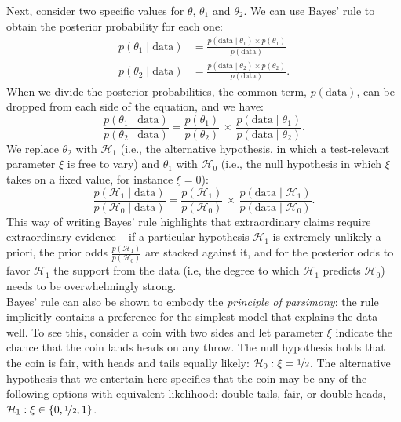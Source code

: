 Next, consider two specific values for $\theta$, $\theta_1$ and $\theta_2$. We can use Bayes' rule to obtain the posterior probability for each one:
\begin{align}
p(\theta_1 \mid \text{data})& =  \frac{p(\text{data} \mid \theta_1) \times p(\theta_1)}{p(\text{data})}\\
p(\theta_2 \mid \text{data})& =  \frac{p(\text{data} \mid \theta_2) \times p(\theta_2)}{p(\text{data})}.
\end{align}
When we divide the posterior probabilities, the common term, $p(\text{data})$, can be dropped from each side of the equation, and we have:
\begin{equation}
    \frac{p(\theta_1 \mid \text{data})}{p(\theta_2 \mid \text{data})} = \frac{p(\theta_1)}{p(\theta_2)} \, \times \, \frac{p(\text{data} \mid \theta_1)}{p(\text{data} \mid \theta_2)}.
\end{equation}
We replace $\theta_2$ with $\mathcal{H}_1$ (i.e., the alternative hypothesis, in which a test-relevant parameter $\xi$ is free to vary) and $\theta_1$ with $\mathcal{H}_0$ (i.e., the null hypothesis in which $\xi$ takes on a fixed value, for instance $\xi=0$):
\begin{equation}
    \frac{p(\mathcal{H}_1 \mid \text{data})}{p(\mathcal{H}_0 \mid \text{data})} = \frac{p(\mathcal{H}_1)}{p(\mathcal{H}_0)} \, \times \, \frac{p(\text{data} \mid \mathcal{H}_1)}{p(\text{data} \mid \mathcal{H}_0)}.
\end{equation}
This way of writing Bayes' rule highlights that extraordinary claims require extraordinary evidence -- if a particular hypothesis $\mathcal{H}_1$ is extremely unlikely a priori, the prior odds $\frac{p(\mathcal{H}_1)}{p(\mathcal{H}_0)}$ are stacked against it, and for the posterior odds to favor $\mathcal{H}_1$ the support from the data (i.e, the degree to which $\mathcal{H}_1$ predicts $\mathcal{H}_0$) needs to be overwhelmingly strong. \\  

Bayes' rule can also be shown to embody the \emph{principle of parsimony}: the rule implicitly contains a preference for the simplest model that explains the data well. To see this, consider a coin with two sides and let parameter $\xi$ indicate the chance that the coin lands heads on any throw. The null hypothesis holds that the coin is fair, with heads and tails equally likely: $\mathcal{H}_0: \xi = \nicefrac{1}{2}$. The alternative hypothesis that we entertain here specifies that the coin may be any of the following options with equivalent likelihood: double-tails, fair, or double-heads, $\mathcal{H}_1: \xi \in \{0, \nicefrac{1}{2}, 1\}$. \\

